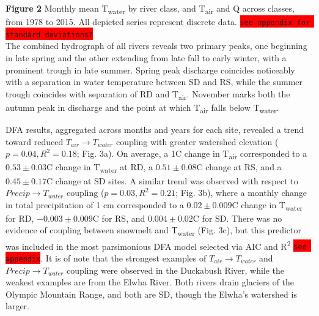 \documentclass{article}
\begin{document}
\textbf{Figure 2} Monthly mean T\textsubscript{water} by river class, and T\textsubscript{air} and Q across classes, from 1978 to 2015. All depicted series represent discrete data. \colorbox{red}{\lstinline{see appendix for standard deviations?}} \setlength{\parskip}{6pt}\\[\baselineskip]

The combined hydrograph of all rivers reveals two primary peaks, one beginning in late spring and the other extending from late fall to early winter, with a prominent trough in late summer. Spring peak discharge coincides noticeably with a separation in water temperature between SD and RS, while the summer trough coincides with separation of RD and T\textsubscript{air}. November marks both the autumn peak in discharge and the point at which T\textsubscript{air} falls below T\textsubscript{water}.

\sloppy
DFA results, aggregated across months and years for each site, revealed a trend toward reduced $T_{air}\rightarrow T_{water}$ coupling with greater watershed elevation ($p=0.04, R^2=0.18$; Fig. 3a). On average, a 1\degree C change in T\textsubscript{air} corresponded to a $0.53\pm 0.03$\degree C change in T\textsubscript{water} at RD, a $0.51\pm 0.08$\degree C change at RS, and a $0.45\pm 0.17$\degree C change at SD sites. A similar trend was observed with respect to $Precip\rightarrow T_{water}$ coupling ($p=0.03, R^2=0.21$; Fig. 3b), where a monthly change in total precipitation of 1 cm corresponded to a $0.02\pm 0.009$\degree C change in T\textsubscript{water} for RD, $-0.003\pm 0.009$\degree C for RS, and $0.004\pm 0.02$\degree C for SD. There was no evidence of coupling between snowmelt and T\textsubscript{water} (Fig. 3c), but this predictor was included in the most parsimonious DFA model selected via AIC and R\textsuperscript{2} \colorbox{red}{\lstinline{see appendix}}. It is of note that the strongest examples of $T_{air}\rightarrow T_{water}$ and $Precip\rightarrow T_{water}$ coupling were observed in the Duckabush River, while the weakest examples are from the Elwha River. Both rivers drain glaciers of the Olympic Mountain Range, and both are SD, though the Elwha's watershed is larger.
\end{document}
